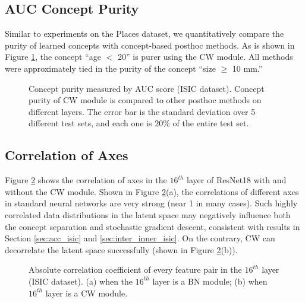 \documentclass{article}
\begin{document}
\subsection{AUC Concept Purity}
\label{sec:auc_isic}
Similar to experiments on the Places dataset, we quantitatively compare the purity of learned concepts with concept-based posthoc methods. As is shown in Figure \ref{fig:auc_isic}, the concept ``age $<$ 20'' is purer using the CW module. All methods were approximately tied in the purity of the concept ``size $\geq$ 10 mm.''
\begin{figure}[ht]
  \caption{Concept purity measured by AUC score (ISIC dataset). Concept purity of CW module is compared to other posthoc methods on different layers. The error bar is the standard deviation over 5 different test sets, and each one is $20\%$ of the entire test set.}
  \label{fig:auc_isic}
\end{figure}


\subsection{Correlation of Axes}
\label{sec:correlation_isic}
Figure \ref{fig:correlation_isic} shows the correlation of axes in the $16^{th}$ layer of ResNet18 with and without the CW module. Shown in Figure \ref{fig:correlation_isic}(a), the correlations of different axes in standard neural networks are very strong (near 1 in many cases). Such highly correlated data distributions in the latent space may negatively influence both the concept separation and stochastic gradient descent, consistent with results in Section \ref{sec:acc_isic} and \ref{sec:inter_inner_isic}. On the contrary, CW can decorrelate the latent space successfully (shown in Figure \ref{fig:correlation_isic}(b)).

\begin{figure}[ht]
  \caption{Absolute correlation coefficient of every feature pair in the $16^{th}$ layer (ISIC dataset). (a) when the $16^{th}$ layer is a BN module; (b) when $16^{th}$ layer is a CW module.}
  \label{fig:correlation_isic}
\end{figure}
\end{document}
